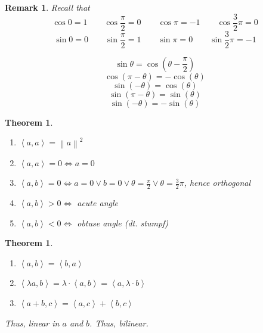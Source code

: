 \documentclass{article}
\newcounter{lecref}[section]
\numberwithin{lecref}{section}
\newtheorem{theorem}[lecref]{Theorem}
\newtheorem{remark}[lecref]{Remark}
\newcommand{\angel}[1]{\left\langle#1\right\rangle}
\newcommand{\norm}[1]{\left\|#1\right\|}
\begin{document}
\begin{remark}
  Recall that
  \[ \cos{0} = 1 \qquad \cos{\frac\pi2} = 0 \qquad \cos{\pi} = -1 \qquad \cos{\frac32 \pi} = 0 \]
  \[ \sin{0} = 0 \qquad \sin{\frac\pi2} = 1 \qquad \sin{\pi} = 0 \qquad \sin{\frac32 \pi} = -1 \]

  \[ \sin\theta = \cos(\theta - \frac\pi2) \]
  \[ \cos(\pi - \theta) = -\cos(\theta) \]
  \[ \sin(-\theta) = \cos(\theta) \]
  \[ \sin(\pi - \theta) = \sin(\theta) \]
  \[ \sin(-\theta) = -\sin(\theta) \]
\end{remark}

\begin{theorem} %
  \begin{enumerate}
    \item $\angel{a,a} = \norm{a}^2$
    \item $\angel{a,a} = 0 \iff a = 0$
    \item $\angel{a,b} = 0 \iff a = 0 \lor b = 0 \lor \theta = \frac\pi2 \lor \theta = \frac32 \pi$, hence orthogonal
    \item $\angel{a,b} > 0 \iff$ acute angle
    \item $\angel{a,b} < 0 \iff$ obtuse angle (dt. \foreignlanguage{german}{stumpf})
  \end{enumerate}
\end{theorem}

\begin{theorem} %
  \label{satz83}
  \begin{enumerate}
    \item $\angel{a,b} = \angel{b,a}$
    \item $\angel{\lambda a, b} = \lambda \cdot \angel{a, b} = \angel{a, \lambda \cdot b}$
    \item $\angel{a+b, c} = \angel{a,c} + \angel{b, c}$
  \end{enumerate}
  Thus, linear in $a$ and $b$. Thus, bilinear.
\end{theorem}
\end{document}

